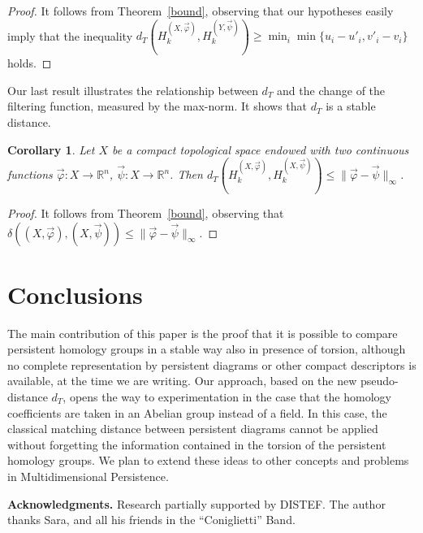 \documentclass{amsart}
\newtheorem{corollary}[theorem]{Corollary}
\theoremstyle{definition}
\theoremstyle{remark}
\newcommand{\p}{\varphi}
\newcommand{\R}{\mathbb{R}}
\numberwithin{equation}{section}
\begin{document}
\begin{proof}\label{proofcor1}
It follows from Theorem~\ref{bound}, observing that our hypotheses easily imply that the inequality $d_T\left( H^{(X,\vec\varphi)}_k, H^{(Y,\vec\psi)}_k\right)\ge \min_i\min \{u_i-u'_i,v'_i-v_i\}$ holds.
\end{proof}

Our last result illustrates the relationship between $d_T$ and the change of the filtering function, measured by the max-norm. It shows that $d_T$ is a stable distance.

\begin{corollary}\label{cor2}
Let $X$ be a compact topological space  endowed with
two continuous functions $\vec \varphi: X \to \R^n$, $\vec \psi: X
\to \R^n$. Then $d_T\left( H^{(X,\vec\varphi)}_k, H^{(X,\vec\psi)}_k\right)\le \|\vec \p-\vec\psi\|_\infty$.
\end{corollary}

\begin{proof}\label{proofcor2}
It follows from Theorem~\ref{bound}, observing that $\delta\left((X,\vec\p),(X,\vec\psi)\right)\le \|\vec \p-\vec\psi\|_\infty$.
\end{proof}


\section*{Conclusions}
The main contribution of this paper is the proof that it is possible to compare persistent homology groups in a stable way also in presence of torsion, although no complete representation by persistent diagrams or other compact descriptors is available, at the time we are writing. Our approach, based on the new pseudo-distance $d_T$, opens the way to experimentation in the case that the homology coefficients are taken in an Abelian group instead of a field. In this case, the classical matching distance between persistent diagrams cannot be applied without forgetting the information contained in the torsion of the persistent homology groups. We plan to extend these ideas to other concepts and problems in Multidimensional Persistence.
\bigskip


{\bf Acknowledgments.} Research partially supported by DISTEF. The author thanks Sara, and all his friends in the ``Coniglietti'' Band.
\end{document}
